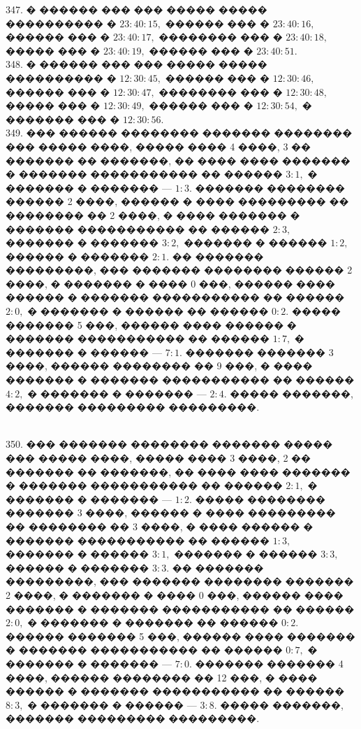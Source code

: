 \documentclass[12pt]{article}
\begin{document}
347. � ������ ��� ��� ����� ����� ���������� � $23:40:15,$ ������ ��� � $23:40:16,$ ������ ��� � $23:40:17,$ �������� ��� � $23:40:18,$ ����� ��� � $23:40:19,$ ������ ��� � $23:40:51.$\\
348. � ������ ��� ��� ����� ����� ���������� � $12:30:45,$ ������ ��� � $12:30:46,$ ������ ��� � $12:30:47,$ �������� ��� � $12:30:48,$ ����� ��� � $12:30:49,$ ������ ��� � $12:30:54,$ � ������� ��� � $12:30:56.$\\
349. ��� ������ �������� ������� �������� ��� ����� ����, ����� ���� 4 ����, 3 �� ������� �� �������, �� ���� ���� ������� � ������� ����������� �� ������ $3:1,$ � ������� � ������� --- $1:3.$ ������� �������� ������ 2 ����, ������ � ���� ��������� �� �������� �� 2 ����, � ���� ������� � ������� ����������� �� ������ $2:3,$ ������� � ������� $3:2,$ ������� � ������ $1:2,$ ������ � ������� $2:1.$ �� ������� ���������, ��� ������� �������� ������ 2 ����, � ������� � ���� 0 ���, ������ ���� ������ � ������� ����������� �� ������ $2:0,$ � ������� � ������ �� ������ $0:2.$ ����� ������� 5 ���, ������ ���� ������ � ������� ����������� �� ������ $1:7,$ � ������� � ������ --- $7:1.$ ������� ������� 3 ����, ������ �������� �� 9 ���, � ���� ������� � ������� ����������� �� ������ $4:2,$ � ������� � ������� --- $2:4.$ ����� �������, ������� ��������� ���������.
\begin{figure}[ht!]
\end{figure}\\
350. ��� ������� �������� ������� ����� ��� ����� ����, ����� ���� 3 ����, 2 �� ������� �� �������, �� ���� ���� ������� � ������� ����������� �� ������ $2:1,$ � ������� � ������� --- $1:2.$ ����� �������� ������� 3 ����, ������ � ���� ��������� �� �������� �� 3 ����, � ���� ������ � ������� ����������� �� ������ $1:3,$ ������� � ������ $3:1,$ ������� � ������ $3:3,$ ������ � ������� $3:3.$ �� ������� ���������, ��� ������� �������� ������� 2 ����, � ������� � ���� 0 ���, ������ ���� ������� � ������� ����������� �� ������ $2:0,$ � ������� � ������� �� ������ $0:2.$ ������ ������� 5 ���, ������ ���� ������� � ������� ����������� �� ������ $0:7,$ � ������� � ������� --- $7:0.$ ������� ������� 4 ����, ������ �������� �� 12 ���, � ���� ������ � ������� ����������� �� ������ $8:3,$ � ������� � ������ --- $3:8.$ ����� �������, ������� ��������� ���������.\\
\begin{figure}[ht!]
\end{figure}\\
\end{document}
